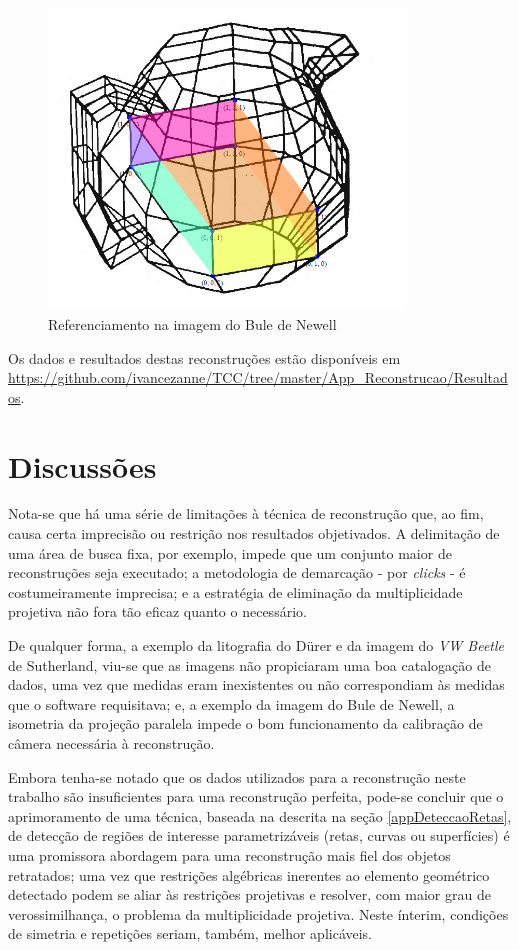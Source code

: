 			\begin{figure}[!htb]
				\centering
				\includegraphics[height=8cm]{imagens/printBuleDispensada.png}
				\caption{Referenciamento na imagem do Bule de Newell}
				\label{imagemBuleDispensada}
			\end{figure}
			
			Os dados e resultados destas reconstruções estão disponíveis em \url{https://github.com/ivancezanne/TCC/tree/master/App_Reconstrucao/Resultados}.
			
		\section{Discussões}
			\label{secaoDiscussoes}
			
			Nota-se que há uma série de limitações à técnica de reconstrução que, ao fim, causa certa imprecisão ou restrição nos resultados objetivados. A delimitação de uma área de busca fixa, por exemplo, impede que um conjunto maior de reconstruções seja executado; a metodologia de demarcação - por \textit{clicks} - é costumeiramente imprecisa; e a estratégia de eliminação da multiplicidade projetiva não fora tão eficaz quanto o necessário.
			
			De qualquer forma, a exemplo da litografia do Dürer e da imagem do \textit{VW Beetle} de Sutherland, viu-se que as imagens não propiciaram uma boa catalogação de dados, uma vez que medidas eram inexistentes ou não correspondiam às medidas que o software requisitava; e, a exemplo da imagem do Bule de Newell, a isometria da projeção paralela impede o bom funcionamento da calibração de câmera necessária à reconstrução.
			
			Embora tenha-se notado que os dados utilizados para a reconstrução neste trabalho são insuficientes para uma reconstrução perfeita, pode-se concluir que o aprimoramento de uma técnica, baseada na descrita na seção \ref{appDeteccaoRetas}, de detecção de regiões de interesse parametrizáveis (retas, curvas ou superfícies) é uma promissora abordagem para uma reconstrução mais fiel dos objetos retratados; uma vez que restrições algébricas inerentes ao elemento geométrico detectado podem se aliar às restrições projetivas e resolver, com maior grau de verossimilhança, o problema da multiplicidade projetiva. Neste ínterim, condições de simetria e repetições seriam, também, melhor aplicáveis.
			
